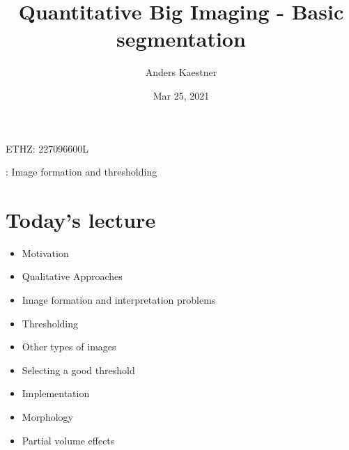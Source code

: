 \documentclass[letterpaper,10pt,english]{sphinxmanual}
\title{Quantitative Big Imaging - Basic segmentation}
\date{Mar 25, 2021}
\author{Anders Kaestner}
\begin{document}
\pagestyle{empty}
\sphinxmaketitle
\pagestyle{plain}
\sphinxtableofcontents
\pagestyle{normal}
\label{\detokenize{04-BasicSegmentation::doc}}




\sphinxAtStartPar
{} ETHZ: 227\sphinxhyphen{}0966\sphinxhyphen{}00L

\sphinxAtStartPar
{}: Image formation and thresholding






\chapter{Today’s lecture}
\label{\detokenize{04-BasicSegmentation:today-s-lecture}}\begin{itemize}
\item {} 
\sphinxAtStartPar
Motivation

\item {} 
\sphinxAtStartPar
Qualitative Approaches

\item {} 
\sphinxAtStartPar
Image formation and interpretation problems

\item {} 
\sphinxAtStartPar
Thresholding

\item {} 
\sphinxAtStartPar
Other types of images

\item {} 
\sphinxAtStartPar
Selecting a good threshold

\item {} 
\sphinxAtStartPar
Implementation

\item {} 
\sphinxAtStartPar
Morphology

\item {} 
\sphinxAtStartPar
Partial volume effects

\end{itemize}
\end{document}
